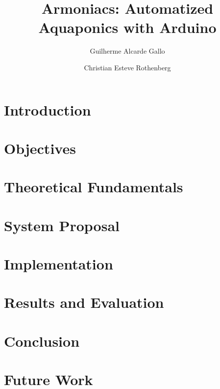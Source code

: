 \documentclass[10pt,a4paper]{article}
\title{Armoniacs: Automatized Aquaponics with Arduino}
\author{Guilherme Alcarde Gallo \and Christian Esteve Rothenberg 
}
\begin{document}
\maketitle

\newpage

\tableofcontents

\newpage

\section{Introduction}
\label{sec:introduction}


\section{Objectives}
\label{objectives}


\section{Theoretical Fundamentals}
\label{fundamentals}


\section{System Proposal}
\label{proposal}


\section{Implementation}
\label{implementation}


\section{Results and Evaluation}
\label{evaluation}


\section{Conclusion}
\label{conclusion}


\section{Future Work}
\label{future}



% 


% 



\nocite{useCaseStyle}
\printbibliography
\end{document}
